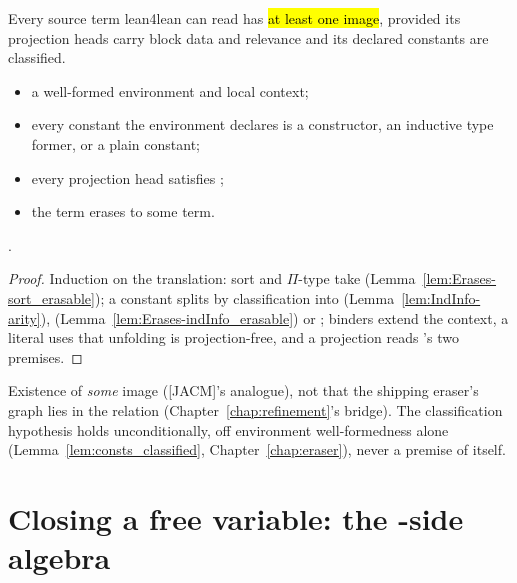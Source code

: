 \begin{theorem}[Totality]
\label{thm:Erases-exists_of_trExprS_of_projInfo}
\leanok
{}
 Every source term lean4lean can read has \hl{at least one \lbox{} image}, provided its projection heads carry block data and relevance and its declared constants are classified.
\begin{itemize}
\item {} a well-formed environment and local context;
\item every constant the environment declares is a constructor, an inductive type former, or a plain constant;
\item every projection head satisfies ;
\item {} the term erases to some \lbox{} term.
\end{itemize}
 \stProved{}.
\end{theorem}
\begin{proof}
\leanok
{}
 Induction on the translation: sort and $\Pi$-type take 
(Lemma~\ref{lem:Erases-sort_erasable}); a constant splits by classification into 
(Lemma~\ref{lem:IndInfo-arity}),  (Lemma~\ref{lem:Erases-indInfo_erasable}) or
; binders extend the context, a literal uses that unfolding is projection-free,
and a projection reads 's two premises.
\end{proof}

\begin{remark}
 Existence of \emph{some} image ([JACM]'s  analogue), not that the shipping eraser's graph lies in the relation (Chapter~\ref{chap:refinement}'s bridge). The classification hypothesis holds unconditionally, off environment well-formedness alone (Lemma~\ref{lem:consts_classified}, Chapter~\ref{chap:eraser}), never a premise of \Erases{} itself.
\end{remark}

\section{Closing a free variable: the \texorpdfstring{\lbox{}}{lambda-box}-side algebra}
\label{sec:erases:abstract}

